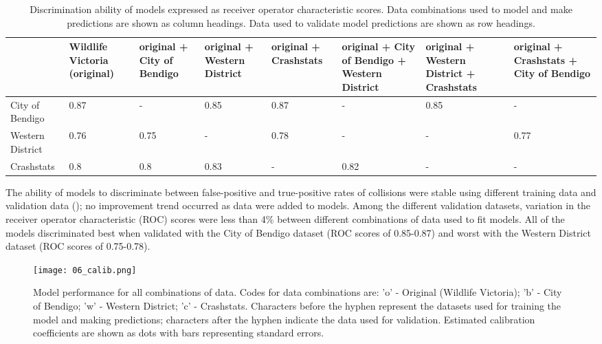 \begin{table}[htp]
\caption[Discrimination ability of models using all combinations of independent data]{Discrimination ability of models expressed as receiver operator characteristic scores. Data combinations used to model and make predictions are shown as column headings. Data used to validate model predictions are shown as row headings.}
\centering
\begin{tabularx}{0.9\textwidth}{YYYYYYYY} \toprule
	& Wildlife Victoria
(original) & original + City of Bendigo & original + Western District & original + Crashstats & original + City of Bendigo + Western District & original + Western District + Crashstats & original + Crashstats + City of Bendigo \\ 
  \midrule
City of Bendigo & 0.87 & - & 0.85 & 0.87 & - & 0.85 & - \\ 
Western District & 0.76 & 0.75 & - & 0.78 & - & - & 0.77 \\ 
Crashstats & 0.8 & 0.8 & 0.83 & - & 0.82 & - & - \\
\bottomrule
\end{tabularx}
\label{val_glm_roc}
\end{table}

The ability of models to discriminate between false-positive and true-positive rates of collisions were stable using different training data and validation data (); no improvement trend occurred as data were added to models. Among the different validation datasets, variation in the receiver operator characteristic (ROC) scores were less than 4\% between different combinations of data used to fit models. All of the models discriminated best when validated with the City of Bendigo dataset (ROC scores of 0.85-0.87) and worst with the Western District dataset (ROC scores of 0.75-0.78). 

\begin{figure*}[htp]
  \centering
  \texttt{[image: 06\_calib.png]}
  \caption[Collision model calibration for all combinations of original and independent data]{Model performance for all combinations of data. Codes for data combinations are: 'o' - Original (Wildlife Victoria); 'b' - City of Bendigo; 'w' - Western District; 'c' - Crashstats. Characters before the hyphen represent the datasets used for training the model and making predictions; characters after the hyphen indicate the data used for validation. Estimated calibration coefficients are shown as dots with bars representing standard errors.}
  \label{val_calib}
\end{figure*}

